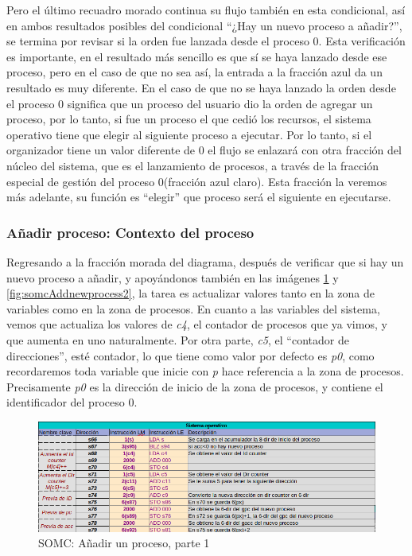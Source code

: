 \documentclass[letterpaper,12pt,oneside]{book}
\begin{document}
            Pero el último recuadro
			morado continua su flujo también en esta condicional, así en ambos resultados posibles del condicional ``¿Hay un nuevo proceso a añadir?'', se termina por
			revisar si la orden fue lanzada desde el proceso 0. Esta verificación es importante, en el resultado más sencillo es que sí se haya lanzado desde ese proceso, pero en el caso
			de que no sea así, la entrada a la fracción azul da un resultado es muy diferente. En el caso de que no se haya lanzado la orden
			desde el proceso 0 significa que un proceso del usuario dio la orden
   de agregar un proceso, por lo tanto, si fue un proceso el que cedió los recursos, el sistema operativo tiene que elegir al siguiente proceso a ejecutar. Por lo tanto, si el organizador tiene un valor diferente de 0
   el flujo se enlazará con otra fracción del núcleo del sistema, que es el lanzamiento de procesos, a través de la fracción especial de gestión del proceso 0(fracción azul claro). Esta fracción la veremos
			más adelante, su función  es ``elegir'' que proceso será el siguiente en ejecutarse.

            \subsubsection{Añadir proceso: Contexto del proceso}
			
			Regresando a la fracción morada del diagrama, después de verificar que si hay un nuevo proceso a añadir, y apoyándonos
			también en las imágenes \ref{fig:somcAddnewprocess} y \ref{fig:somcAddnewprocess2}, la tarea es actualizar valores tanto en la zona de variables
			como en la zona de procesos. En cuanto a las variables del sistema, vemos que actualiza los valores de \textit{c4}, el contador
			de procesos que ya vimos, y que aumenta en uno naturalmente. Por otra parte, \textit{c5}, el ``contador de direcciones'', esté contador,
			lo que tiene como valor por defecto es \textit{p0}, como recordaremos toda variable que inicie con \textit{p} hace referencia a la zona de procesos.
			Precisamente \textit{p0} es la dirección de inicio de la zona de procesos, y contiene el identificador del proceso 0. 


		\begin{figure}[h]		
			\centering
			\includegraphics[scale=0.55]{media/CARDIACC/SO_AddNewProcess.png}
			\caption{SOMC: Añadir un proceso, parte 1}
			\label{fig:somcAddnewprocess}
		\end{figure}
		
\end{document}
